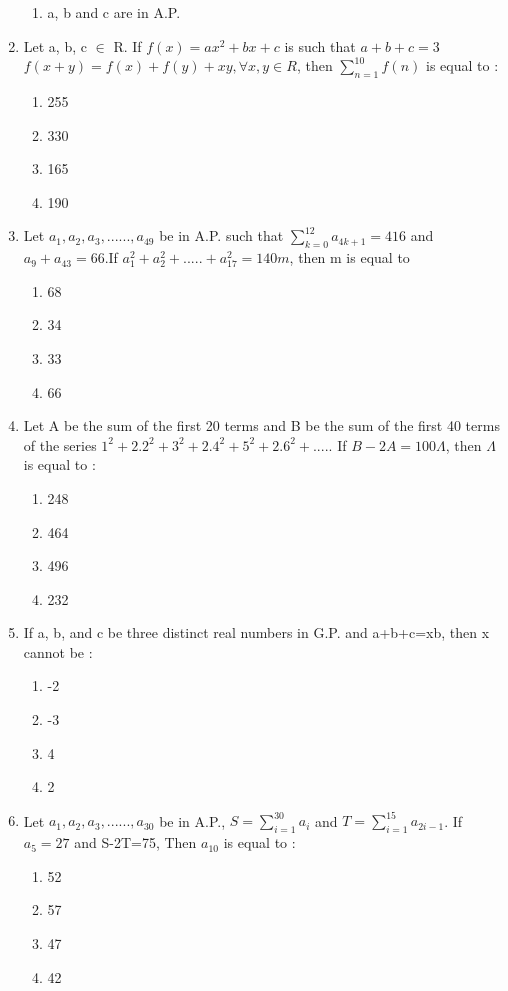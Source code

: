 \begin{enumerate}[label=\arabic*.,ref=\thesubsection.\theenumi]
\begin{enumerate}
\item a, b and c are in A.P.
\end{enumerate}
\item Let a, b, c $\in$ R. If $f(x)=ax^2+bx+c$ is such that $a+b+c=3$   $f(x+y)=f(x)+f(y)+xy,\forall x, y \in R$, then $\sum_{n=1}^{10}f(n)$ is equal to :
\begin{enumerate}
\item 255
\item 330
\item 165
\item 190
\end{enumerate}
\item Let $a_1,a_2,a_3,......,a_{49}$ be in A.P. such that $\sum_{k=0}^{12}a_{4k+1}=416$ and $a_9+a_{43}=66$.If $a_1^2+a_2^2+.....+a_{17}^2=140m$, then m is equal to
\begin{enumerate}
\item 68
\item 34
\item 33
\item 66
\end{enumerate}
\item Let A be the sum of the first 20 terms and B be the sum of the first 40 terms of the series $1^2+2.2^2+3^2+2.4^2+5^2+2.6^2+.....$ If $B-2A=100\Lambda$, then $\Lambda$ is equal to :
\begin{enumerate}
\item 248
\item 464
\item 496
\item 232
\end{enumerate}
\item If a, b, and c be three distinct real numbers in G.P. and a+b+c=xb, then x cannot be :
\begin{enumerate}
\item -2
\item -3
\item 4
\item 2
\end{enumerate}
\item Let $a_1,a_2,a_3,......,a_{30}$ be in A.P., $S=\sum_{i=1}^{30}a_i$ and $T=\sum_{i=1}^{15}a_{2i-1}$. If $a_5=27$ and S-2T=75, Then $a_{10}$ is equal to :
\begin{enumerate}
\item 52
\item 57
\item 47
\item 42
\end{enumerate}

\end{enumerate}
